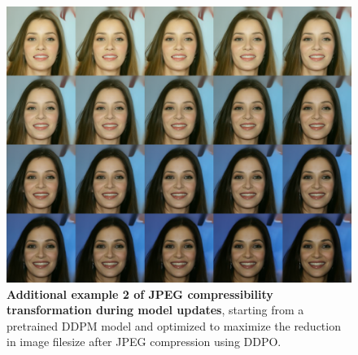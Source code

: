 \begin{appendixs}
        \begin{figure}
            \centering
            \includegraphics[scale=1.40]{img/results/compressibility_44.png}
            \vspace{-0pt}  %
            \captionsetup{width=\textwidth} %
            \caption{\textbf{Additional example 2 of JPEG compressibility transformation during model updates}, starting from a pretrained DDPM model and optimized to maximize the reduction in image filesize after JPEG compression using DDPO.}
            \label{fig:ddpm-to-ddpo-compressibility-extra2}
        \end{figure}


\end{appendixs}
